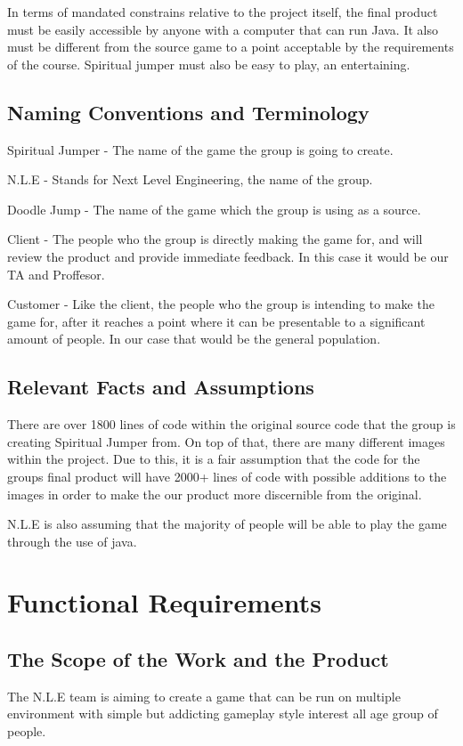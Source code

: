\documentclass[12pt, titlepage]{article}
\begin{document}
In terms of mandated constrains relative to the project itself, the final product must be easily accessible by anyone with a computer that can run Java. It also must be different from the source game to a point acceptable by the requirements of the course. Spiritual jumper must also be easy to play, an entertaining.

\subsection{Naming Conventions and Terminology}

Spiritual Jumper - The name of the game the group is going to create.

N.L.E - Stands for Next Level Engineering, the name of the group.

Doodle Jump - The name of the game which the group is using as a source.

Client - The people who the group is directly making the game for, and will review the product and provide immediate feedback. In this case it would be our TA and Proffesor. 

Customer - Like the client, the people who the group is intending to make the game for, after it reaches a point where it can be presentable to a significant amount of people. In our case that would be the general population.

\subsection{Relevant Facts and Assumptions}

There are over 1800 lines of code within the original source code that the group is creating Spiritual Jumper from. On top of that, there are many different images within the project. Due to this, it is a fair assumption that the code for the groups final product will have 2000+ lines of code with possible additions to the images in order to make the our product more discernible from the original. 

N.L.E is also assuming that the majority of people will be able to play the game through the use of java.

\section{Functional Requirements}

\subsection{The Scope of the Work and the Product}
The N.L.E team is aiming to create a game that can be run on multiple environment with simple but addicting gameplay style interest all age group of people.
\end{document}
